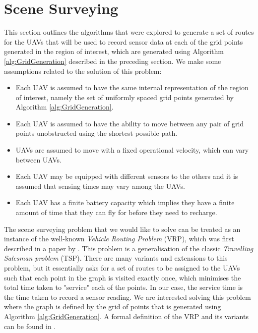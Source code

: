 
\section{Scene Surveying}
This section outlines the algorithms that were explored to generate a set of routes for the UAVs that will be used to record sensor data at each of the grid points generated in the region of interest, which are generated using Algorithm \ref{alg:GridGeneration} described in the preceding section. We make some assumptions related to the solution of this problem:
\begin{itemize}
    \item Each UAV is assumed to have the same internal representation of the region of interest, namely the set of uniformly spaced grid points generated by Algorithm \ref{alg:GridGeneration}.
    \item Each UAV is assumed to have the ability to move between any pair of grid points unobstructed using the shortest possible path.
    \item UAVs are assumed to move with a fixed operational velocity, which can vary between UAVs.
    \item Each UAV may be equipped with different sensors to the others and it is assumed that sensing times may vary among the UAVs.
    \item Each UAV has a finite battery capacity which implies they have a finite amount of time that they can fly for before they need to recharge.
\end{itemize}


The scene surveying problem that we would like to solve can be treated as an instance of the well-known \textit{Vehicle Routing Problem} (VRP), which was first described in a paper by \citeauthor{Dantzig1959TheProblem} \cite{Dantzig1959TheProblem}. This problem is a generalisation of the classic \textit{Travelling Salesman problem} (TSP). There are many variants and extensions to this problem, but it essentially asks for a set of routes to be assigned to the UAVs such that each point in the graph is visited exactly once, which minimises the total time taken to "service" each of the points. In our case, the service time is the time taken to record a sensor reading. We are interested solving this problem where the graph is defined by the grid of points that is generated using Algorithm \ref{alg:GridGeneration}. A formal definition of the VRP and its variants can be found in \cite{Toth2002TheProblem}.

